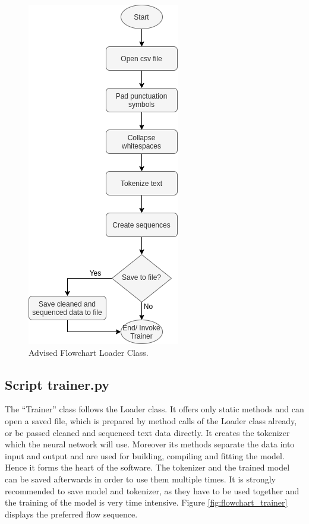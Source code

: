 \documentclass[hidelinks, conference]{IEEEtran}
\begin{document}
\begin{figure}[htbp]
\centerline{\includegraphics[scale=0.65]{pictures/flowchart_loader.png}}
\caption{Advised Flowchart Loader Class.}
\label{fig:flowchart_loader}
\end{figure}

\subsection{Script trainer.py}\label{subsec_trainer}

The ``Trainer'' class follows the Loader class. It offers only static methods and can open a saved file, which is prepared by method calls of the Loader class already, or be passed cleaned and sequenced text data directly. It creates the tokenizer which the neural network will use. Moreover its methods separate the data into input and output and are used for building, compiling and fitting the model. Hence it forms the heart of the software. The tokenizer and the trained model can be saved afterwards in order to use them multiple times. It is strongly recommended to save model and tokenizer, as they have to be used together and the training of the model is very time intensive. Figure \ref{fig:flowchart_trainer} displays the preferred flow sequence.
\end{document}
